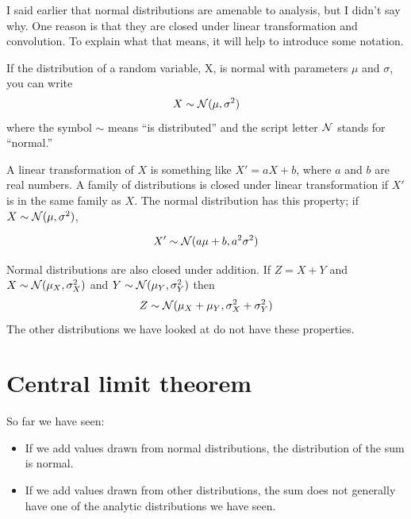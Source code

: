 \documentclass[12pt]{book}
\begin{document}
I said earlier that normal distributions are amenable to analysis,
but I didn't say why.  One reason is that they are
closed under linear transformation and convolution.  To explain what
that means, it will help to introduce some notation.

If the distribution of a random variable, X, is
normal with parameters $\mu$ and $\sigma$, you can write
%
\[ X \sim \mathcal{N} (\mu, \sigma^{2})\]
%
where the symbol $\sim$ means ``is distributed'' and the script letter
$\mathcal{N}$ stands for ``normal.''


A linear transformation of $X$ is something like $X' = a X + b$, where
$a$ and $b$ are real numbers.
A family of distributions is closed under
linear transformation if $X'$ is in the same family as $X$.  The normal
distribution has this property; if $X \sim \mathcal{N} (\mu,
\sigma^2)$,

\[ X' \sim \mathcal{N} (a \mu + b, a^{2} \sigma^2)\]

Normal distributions are also closed under addition.  
If $Z = X + Y$ and
$X \sim \mathcal{N} (\mu_{X}, \sigma_{X}^{2})$ and
$Y \sim \mathcal{N} (\mu_{Y}, \sigma_{Y}^{2})$ then
%
\[ Z \sim \mathcal{N} (\mu_X + \mu_Y, \sigma_X^2 + \sigma_Y^2) \]
%
The other distributions we have looked at do not have these
properties.



\section{Central limit theorem}
\label{CLT}

So far we have seen:

\begin{itemize}

\item If we add values drawn from normal distributions, the distribution
of the sum is normal.

\item If we add values drawn from other distributions, the sum does not
generally have one of the analytic distributions we have seen.

\end{itemize}
\end{document}
